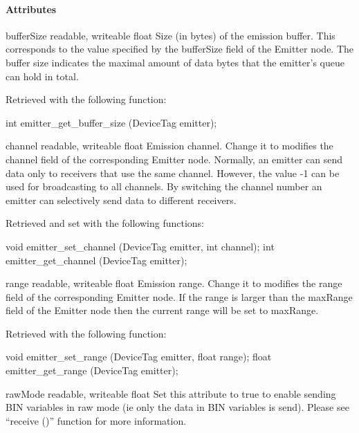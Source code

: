 \paragraph{Attributes}

\noindent
\begin{itemize}
\begin{attribute}{bufferSize}
  {readable, writeable}
  {float}
  {}
  Size (in bytes) of the emission buffer. This
  corresponds to the value specified by the bufferSize field of the
  Emitter node. The buffer size indicates the maximal amount of data
  bytes that the emitter's queue can hold in total.

  Retrieved with the following \webots function:

\begin{cxx}
int emitter_get_buffer_size  (DeviceTag emitter);
\end{cxx}
\end{attribute}

\begin{attribute}{channel}
  {readable, writeable}
  {float}
  {}
  Emission channel. Change it to modifies the channel
  field of the corresponding Emitter node. Normally, an emitter can
  send data only to receivers that use the same channel. However, the
  value -{}1 can be used for broadcasting to all channels. By
  switching the channel number an emitter can selectively send data to
  different receivers.

  Retrieved and set with the following \webots functions:
\begin{cxx}
void emitter_set_channel  (DeviceTag emitter, int channel);
int emitter_get_channel (DeviceTag emitter);
\end{cxx}
\end{attribute}

\begin{attribute}{range}
  {readable, writeable}
  {float}
  {}
  Emission range. Change it to modifies the range field of
 the corresponding Emitter node. If the range is larger than the
 maxRange field of the Emitter node then the current range will be set
 to maxRange.

 Retrieved with the following \webots function:

\begin{cxx}
void emitter_set_range  (DeviceTag emitter, float range);
float emitter_get_range (DeviceTag emitter);
\end{cxx}
\end{attribute}

\begin{attribute}{rawMode}
  {readable, writeable}
  {float}
  {}
  Set this attribute to true to enable sending BIN
 variables in raw mode (ie only the data in BIN variables is
 send). Please see ``receive ()'' function for more information.
\end{attribute}
\end{itemize}

